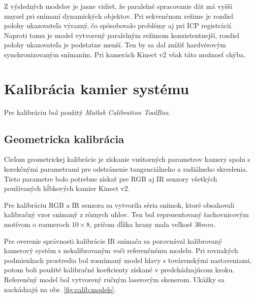 Z výsledných modelov je jasne vidieť, že paralelné spracovanie dát má vyšší zmysel pri snímaní dynamických objektov. Pri sekvenčnom režime je rozdiel polohy ukazovateľa výrazný, čo spôsobovalo problémy aj pri ICP registrácií. Naproti tomu je model vytvorený paralelným režimom konzistentnejší, rozdiel polohy ukazovateľa je podstatne menší. Ten by sa dal znížiť hardvérovým synchronizovaným snímaním. Pri kamerách Kinect v2 však táto možnosť chýba.

\section{Kalibrácia kamier systému}
\label{sec:kinect_calib}
Pre kalibráciu bol použitý \textit{Matlab Calibration ToolBox}. 

\subsection{Geometricka kalibrácia}
Cieľom geometrickej kalibrácie je získanie vnútorných parametrov  kamery spolu s korekčnými parametrami pre odstránenie tangenciálneho a radiálneho skreslenia. Tieto parametre bolo potrebne získať pre RGB aj IR senzory všetkých používaných hĺbkových kamier Kinect v2. 

Pre kalibráciu RGB a IR senzora sa vytvorila séria snímok, ktoré  obsahovali kalibračný vzor snímaný z rôznych uhlov. Ten bol reprezentovaný šachovnicovým motívom o rozmeroch $10\times8$, pričom dĺžka hrany mala veľkosť $36mm$.



Pre overenie správnosti kalibrácie IR snímača sa porovnával kalibrovaný kamerový systém s nekalibrovaným voči referenčnému modelu. Pri rovnakých podmienkach prostredia bol zosnímaný model hlavy s továrenskými nastaveniami, potom boli použité kalibračné koeficienty získané v predchádzajúcom kroku. Referenčný model bol vytvorený ručným laserovým skenerom. Ukážky sa nachádzajú na obr. \ref{fig:calib:models}. 

